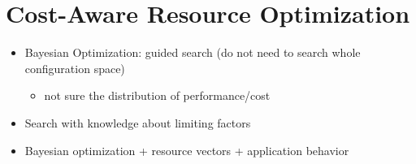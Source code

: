 \section{Cost-Aware Resource Optimization}
\label{sec:cost-aware}

\begin{itemize}
  \item Bayesian Optimization: guided search (do not need to search whole configuration space)
  	\begin{itemize}
  	  \item not sure the distribution of performance/cost
  	\end{itemize}
  \item Search with knowledge about limiting factors
  \item Bayesian optimization + resource vectors + application behavior
\end{itemize}